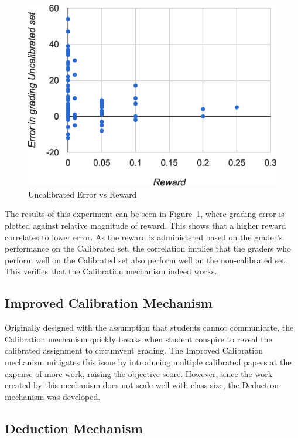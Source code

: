 \documentclass{chi-ext}
\begin{document}
\begin{figure}
  \centering
  \includegraphics[width=\linewidth]{Reward-Error-Graph.eps}
  \caption{Uncalibrated Error vs Reward}
  \label{fig:reward-error}
\end{figure}

The results of this experiment can be seen in Figure~\ref{fig:reward-error}, where grading error is plotted against relative magnitude of reward. This shows that a higher reward correlates to lower error. As the reward is administered based on the grader's performance on the Calibrated set, the correlation implies that the graders who perform well on the Calibrated set also perform well on the non-calibrated set. This verifies that the Calibration mechanism indeed works.

\subsection{Improved Calibration Mechanism}
Originally designed with the assumption that students cannot communicate, the Calibration mechanism quickly breaks when student conspire to reveal the calibrated assignment to circumvent grading. The Improved Calibration mechanism mitigates this issue by introducing multiple calibrated papers at the expense of more work, raising the objective score. However, since the work created by this mechanism does not scale well with class size, the Deduction mechanism was developed.

\subsection{Deduction Mechanism}
\end{document}
